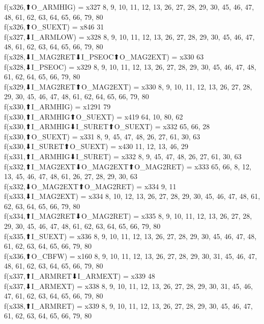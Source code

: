 f(x326,⬆O_ARMHIG) = x327 {8, 9, 10, 11, 12, 13, 26, 27, 28, 29, 30, 45, 46, 47, 48, 61, 62, 63, 64, 65, 66, 79, 80} \\
f(x326,⬆O_SUEXT) = x846 {31} \\
f(x327,⬇I_ARMLOW) = x328 {8, 9, 10, 11, 12, 13, 26, 27, 28, 29, 30, 45, 46, 47, 48, 61, 62, 63, 64, 65, 66, 79, 80} \\
f(x328,⬇I_MAG2RET⬇I_PSEOC⬆O_MAG2EXT) = x330 {63} \\
f(x328,⬇I_PSEOC) = x329 {8, 9, 10, 11, 12, 13, 26, 27, 28, 29, 30, 45, 46, 47, 48, 61, 62, 64, 65, 66, 79, 80} \\
f(x329,⬇I_MAG2RET⬆O_MAG2EXT) = x330 {8, 9, 10, 11, 12, 13, 26, 27, 28, 29, 30, 45, 46, 47, 48, 61, 62, 64, 65, 66, 79, 80} \\
f(x330,⬆I_ARMHIG) = x1291 {79} \\
f(x330,⬆I_ARMHIG⬆O_SUEXT) = x419 {64, 10, 80, 62} \\
f(x330,⬆I_ARMHIG⬇I_SURET⬆O_SUEXT) = x332 {65, 66, 28} \\
f(x330,⬆O_SUEXT) = x331 {8, 9, 45, 47, 48, 26, 27, 61, 30, 63} \\
f(x330,⬇I_SURET⬆O_SUEXT) = x430 {11, 12, 13, 46, 29} \\
f(x331,⬆I_ARMHIG⬇I_SURET) = x332 {8, 9, 45, 47, 48, 26, 27, 61, 30, 63} \\
f(x332,⬆I_MAG2EXT⬇O_MAG2EXT⬆O_MAG2RET) = x333 {65, 66, 8, 12, 13, 45, 46, 47, 48, 61, 26, 27, 28, 29, 30, 63} \\
f(x332,⬇O_MAG2EXT⬆O_MAG2RET) = x334 {9, 11} \\
f(x333,⬇I_MAG2EXT) = x334 {8, 10, 12, 13, 26, 27, 28, 29, 30, 45, 46, 47, 48, 61, 62, 63, 64, 65, 66, 79, 80} \\
f(x334,⬆I_MAG2RET⬇O_MAG2RET) = x335 {8, 9, 10, 11, 12, 13, 26, 27, 28, 29, 30, 45, 46, 47, 48, 61, 62, 63, 64, 65, 66, 79, 80} \\
f(x335,⬆I_SUEXT) = x336 {8, 9, 10, 11, 12, 13, 26, 27, 28, 29, 30, 45, 46, 47, 48, 61, 62, 63, 64, 65, 66, 79, 80} \\
f(x336,⬆O_CBFW) = x160 {8, 9, 10, 11, 12, 13, 26, 27, 28, 29, 30, 31, 45, 46, 47, 48, 61, 62, 63, 64, 65, 66, 79, 80} \\
f(x337,⬆I_ARMRET⬇I_ARMEXT) = x339 {48} \\
f(x337,⬇I_ARMEXT) = x338 {8, 9, 10, 11, 12, 13, 26, 27, 28, 29, 30, 31, 45, 46, 47, 61, 62, 63, 64, 65, 66, 79, 80} \\
f(x338,⬆I_ARMRET) = x339 {8, 9, 10, 11, 12, 13, 26, 27, 28, 29, 30, 45, 46, 47, 61, 62, 63, 64, 65, 66, 79, 80} \\
